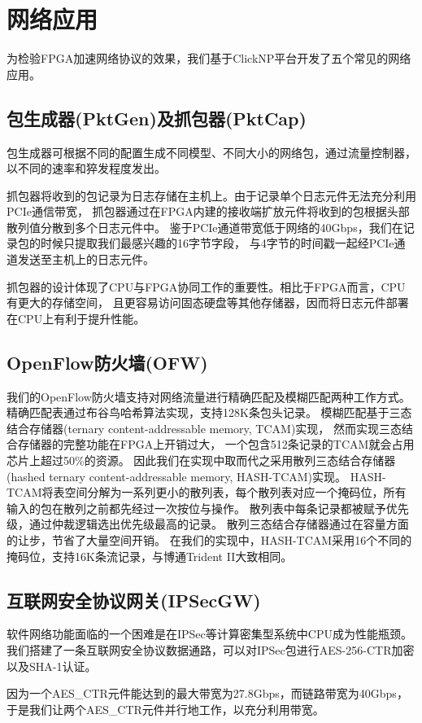\chapter{网络应用}
为检验FPGA加速网络协议的效果，我们基于ClickNP平台开发了五个常见的网络应用。

\section{包生成器(PktGen)及抓包器(PktCap)}
包生成器可根据不同的配置生成不同模型、不同大小的网络包，通过流量控制器，以不同的速率和猝发程度发出。

抓包器将收到的包记录为日志存储在主机上。由于记录单个日志元件无法充分利用PCIe通信带宽，
抓包器通过在FPGA内建的接收端扩放元件将收到的包根据头部散列值分散到多个日志元件中。
鉴于PCIe通道带宽低于网络的40Gbps，我们在记录包的时候只提取我们最感兴趣的16字节字段，
与4字节的时间戳一起经PCIe通道发送至主机上的日志元件。

抓包器的设计体现了CPU与FPGA协同工作的重要性。相比于FPGA而言，CPU有更大的存储空间，
且更容易访问固态硬盘等其他存储器，因而将日志元件部署在CPU上有利于提升性能。

\section{OpenFlow防火墙(OFW)}
我们的OpenFlow防火墙支持对网络流量进行精确匹配及模糊匹配两种工作方式。
精确匹配表通过布谷鸟哈希算法实现，支持128K条包头记录。
模糊匹配基于三态结合存储器(ternary content-addressable memory, TCAM)实现，
然而实现三态结合存储器的完整功能在FPGA上开销过大，
一个包含512条记录的TCAM就会占用芯片上超过50\%的资源。
因此我们在实现中取而代之采用散列三态结合存储器(hashed ternary content-addressable memory, HASH-TCAM)实现。
HASH-TCAM将表空间分解为一系列更小的散列表，每个散列表对应一个掩码位，所有输入的包在散列之前都先经过一次按位与操作。
散列表中每条记录都被赋予优先级，通过仲裁逻辑选出优先级最高的记录。
散列三态结合存储器通过在容量方面的让步，节省了大量空间开销。
在我们的实现中，HASH-TCAM采用16个不同的掩码位，支持16K条流记录，与博通Trident II大致相同。

\section{互联网安全协议网关(IPSecGW)}
软件网络功能面临的一个困难是在IPSec等计算密集型系统中CPU成为性能瓶颈。
我们搭建了一条互联网安全协议数据通路，可以对IPSec包进行AES-256-CTR加密以及SHA-1认证。

因为一个AES\_CTR元件能达到的最大带宽为27.8Gbps，而链路带宽为40Gbps，
于是我们让两个AES\_CTR元件并行地工作，以充分利用带宽。

